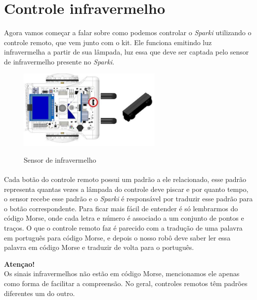 \section{Controle infravermelho}
\label{ref:controle}
\paragraph{}
Agora vamos começar a falar sobre como podemos controlar o \textit{Sparki} utilizando o controle remoto, que vem junto com o kit. Ele funciona emitindo luz infravermelha a partir de sua lâmpada, luz essa que deve ser captada pelo sensor de infravermelho presente no \textit{Sparki}.

    \begin{figure}[h]
    \caption{Sensor de infravermelho}
     
    \centering 
    \includegraphics[width=7cm]{Figuras/sensor.JPG}
    \label{figura:sensor.jpeg}
    \end{figure}

\paragraph{}
Cada botão do controle remoto possui um padrão a ele relacionado, esse padrão representa quantas vezes a lâmpada do controle deve piscar e por quanto tempo, o sensor recebe esse padrão e o \textit{Sparki} é responsável por traduzir esse padrão para o botão correspondente. Para ficar mais fácil de entender é só lembrarmos do código Morse, onde cada letra e número é associado a um conjunto de pontos e traços. O que o controle remoto faz é parecido com a tradução de uma palavra em português  para código Morse, e depois o nosso robô deve saber ler essa palavra em código Morse e traduzir de volta para o português.

    \begin{center}
    \textcolor{mydarkblue}{\textbf{Atençao!}}
    \\ Os sinais infravermelhos não estão em código Morse, mencionamos ele apenas como forma de facilitar a compreensão. No geral, controles remotos têm padrões diferentes um do outro.
    \end{center}

